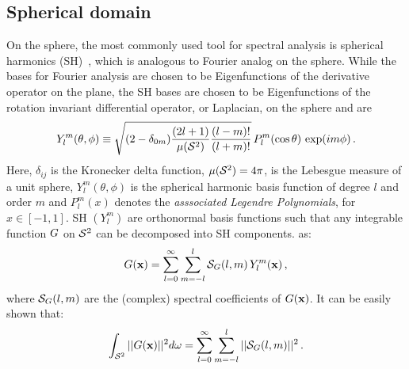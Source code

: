 %
%
%
\subsection{Spherical domain}
On the sphere, the most commonly used tool for spectral analysis is spherical harmonics
(SH)~\cite{Groemer1996}, which is analogous to Fourier analog on the sphere. While the bases for Fourier analysis are chosen to be Eigenfunctions of the derivative operator on the plane, the SH bases are chosen to be Eigenfunctions of the rotation invariant differential operator, or Laplacian, on the sphere and are
%
\begin{equation}
\label{eq:SH}
Y_l^m(\theta,\phi) \equiv {\sqrt{(2-\delta_{0m})\frac{(2l+1)}{{\mu({\mathcal{S}^{2}})}}\frac{(l-m)!}{(l+m)!}}} \, P_l^m(\cos\theta) \, \exp({im\phi})\,.
\end{equation}
%
Here, $\delta_{ij}$ is the Kronecker delta function, ${\mu({\mathcal{S}^{2}})}=4\pi$, is the Lebesgue measure of a unit 
sphere, $Y_l^m(\theta,\phi)$ is the spherical harmonic basis
function of degree $l$ and order $m$ and $P_l^m(x)$ denotes  the \emph{asssociated Legendre
Polynomials}, for $x \in [-1,1]$. SH $(Y_l^m)$ are orthonormal basis functions such that  any integrable function
${G}$ on ${\mathcal{S}^{2}}$ can be decomposed into SH components.
 as:
\begin{align}
\label{eq:SHDecomposition}
{G}(\mathbf{x}) = \sum_{l=0}^{\infty} \sum_{m=-l}^{l}  \mathcal{S}_{{G}}(l,m) \, Y_l^m(\mathbf{x})\,,
\end{align}
%
where $\mathcal{S}_{{G}}(l,m)$ are the (complex) spectral coefficients of ${G}(\mathbf{x})$. 
It can be easily shown that:
%
\begin{equation}
\int_{{\mathcal{S}^{2}}} ||{G}(\mathbf{x})||^2 d\omega = \sum_{l=0}^{\infty} \sum_{m=-l}^{l} ||\mathcal{S}_{{G}}(l,m)||^2\,.
\end{equation}

